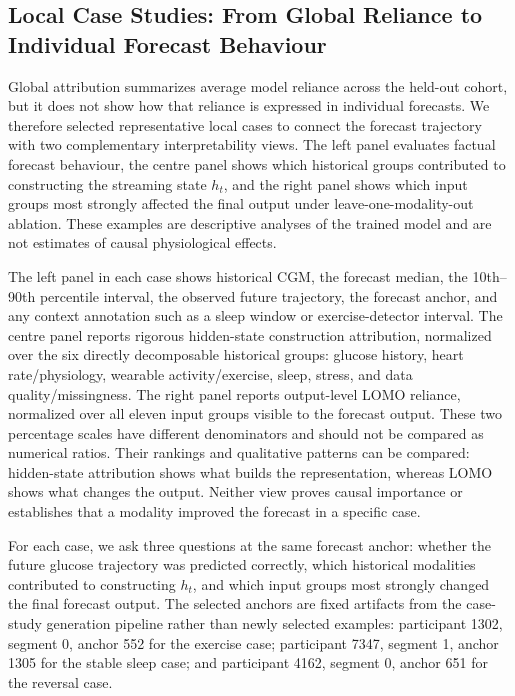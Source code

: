 \subsection{Local Case Studies: From Global Reliance to Individual Forecast Behaviour}
\label{subsec:interp_local_cases}

Global attribution summarizes average model reliance across the held-out
cohort, but it does not show how that reliance is expressed in individual
forecasts. We therefore selected representative local cases to connect the
forecast trajectory with two complementary interpretability views. The left
panel evaluates factual forecast behaviour, the centre panel shows which
historical groups contributed to constructing the streaming state $h_t$, and
the right panel shows which input groups most strongly affected the final
output under leave-one-modality-out ablation. These examples are descriptive
analyses of the trained model and are not estimates of causal physiological
effects.

The left panel in each case shows historical CGM, the forecast median, the
10th--90th percentile interval, the observed future trajectory, the forecast
anchor, and any context annotation such as a sleep window or exercise-detector
interval. The centre panel reports rigorous hidden-state construction
attribution, normalized over the six directly decomposable historical groups:
glucose history, heart rate/physiology, wearable activity/exercise, sleep,
stress, and data quality/missingness. The right panel reports output-level
LOMO reliance, normalized over all eleven input groups visible to the forecast
output. These two percentage scales have different denominators and should not
be compared as numerical ratios. Their rankings and qualitative patterns can
be compared: hidden-state attribution shows what builds the representation,
whereas LOMO shows what changes the output. Neither view proves causal
importance or establishes that a modality improved the forecast in a specific
case.

For each case, we ask three questions at the same forecast anchor: whether the
future glucose trajectory was predicted correctly, which historical modalities
contributed to constructing $h_t$, and which input groups most strongly changed
the final forecast output. The selected anchors are fixed artifacts from the
case-study generation pipeline rather than newly selected examples:
participant 1302, segment 0, anchor 552 for the exercise case; participant
7347, segment 1, anchor 1305 for the stable sleep case; and participant 4162,
segment 0, anchor 651 for the reversal case.

